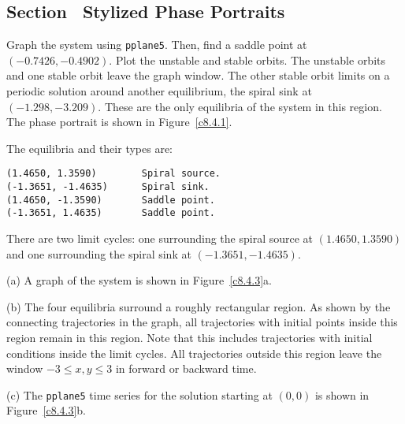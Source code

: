 \documentclass{ximera}
\begin{document}
\begin{figure}[htb]
                       \centerline{%
                       }
\end{figure}



\subsection*{Section~\protect{\ref{S:SPP}} Stylized Phase Portraits}

Graph the system using {\tt pplane5}.  Then, find a saddle point at
$(-0.7426,-0.4902)$.  Plot the unstable and stable orbits.  The unstable
orbits and one stable orbit leave the graph window.  The other stable
orbit limits on a periodic solution around another equilibrium, the
spiral sink at $(-1.298,-3.209)$.  These are the only equilibria of
the system in this region.  The phase portrait is shown in
Figure~\ref{c8.4.1}.

\begin{figure}[htb]
                       \centerline{%
                       }
\end{figure}

The equilibria and their types are:
\begin{verbatim}
(1.4650, 1.3590)        Spiral source.           
(-1.3651, -1.4635)      Spiral sink.             
(1.4650, -1.3590)       Saddle point.            
(-1.3651, 1.4635)       Saddle point. 
\end{verbatim}
There are two limit cycles: one surrounding the spiral source at
$(1.4650, 1.3590)$ and one surrounding the spiral sink at $(-1.3651, -1.4635)$.

(a) A graph of the system is shown in Figure~\ref{c8.4.3}a.

(b) The four equilibria surround a roughly rectangular region.  As shown
by the connecting trajectories in the graph, all trajectories with
initial points inside this region remain in this region.  Note that this
includes trajectories with initial conditions inside the limit cycles.
All trajectories outside this region leave the window
$-3 \leq x,y \leq 3$ in forward or backward time.

(c) The {\tt pplane5} time series for the solution starting at $(0,0)$ is
shown in Figure~\ref{c8.4.3}b.
\end{document}
